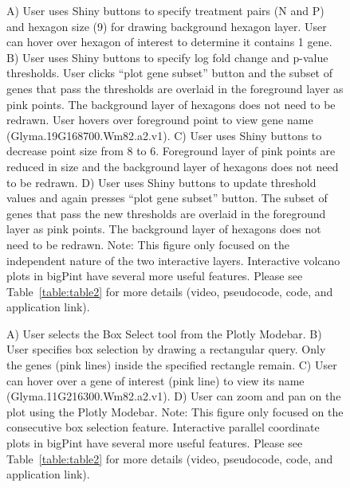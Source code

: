 \documentclass[parskip=full]{bmcart}
\begin{document}
\begin{backmatter}
\begin{figure}[h!]
\caption{
A) User uses Shiny buttons to specify treatment pairs (N and P) and hexagon size (9) for drawing background hexagon layer. User can hover over hexagon of interest to determine it contains 1 gene. B) User uses Shiny buttons to specify log fold change and p-value thresholds. User clicks “plot gene subset” button and the subset of genes that pass the thresholds are overlaid in the foreground layer as pink points. The background layer of hexagons does not need to be redrawn. User hovers over foreground point to view gene name (Glyma.19G168700.Wm82.a2.v1). C) User uses Shiny buttons to decrease point size from 8 to 6. Foreground layer of pink points are reduced in size and the background layer of hexagons does not need to be redrawn. D) User uses Shiny buttons to update threshold values and again presses “plot gene subset” button. The subset of genes that pass the new thresholds are overlaid in the foreground layer as pink points. The background layer of hexagons does not need to be redrawn. Note: This figure only focused on the independent nature of the two interactive layers. Interactive volcano plots in bigPint have several more useful features. Please see Table~\ref{table:table2} for more details (video, pseudocode, code, and application link).}
\label{figureVolcano}
\end{figure}

\begin{figure}[h!]
\caption{
A) User selects the Box Select tool from the Plotly Modebar. B) User specifies box selection by drawing a rectangular query. Only the genes (pink lines) inside the specified rectangle remain. C) User can hover over a gene of interest (pink line) to view its name (Glyma.11G216300.Wm82.a2.v1). D) User can zoom and pan on the plot using the Plotly Modebar. Note: This figure only focused on the consecutive box selection feature. Interactive parallel coordinate plots in bigPint have several more useful features. Please see Table~\ref{table:table2} for more details (video, pseudocode, code, and application link).}
\label{figurePCP}
\end{figure}



\end{backmatter}
\end{document}
